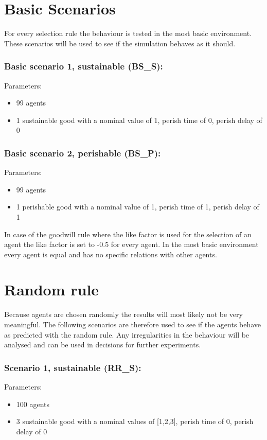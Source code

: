 \documentclass[twoside,openright]{uva-bachelor-thesis}
\begin{document}
\section{Basic Scenarios}
For every selection rule the behaviour is tested in the most basic environment. These scenarios will be used to see if the simulation behaves as it should.
\subsubsection{Basic scenario 1, sustainable (BS\_S):}
Parameters:
\begin{itemize}
\item	99 agents
\item	1 sustainable good with a nominal value of 1, perish time of 0, perish delay of 0
\end{itemize}
\subsubsection{Basic scenario 2, perishable (BS\_P):}
Parameters:
\begin{itemize}
\item	99 agents
\item	1 perishable good with a nominal value of 1, perish time of 1, perish delay of 1
\end{itemize}
In case of the goodwill rule where the like factor is used for the selection of an agent the like factor is set to -0.5 for every agent. In the most basic environment every agent is equal and has no specific relations with other agents.

\section{Random rule}
Because agents are chosen randomly the results will most likely not be very meaningful. The following scenarios are therefore used to see if the agents behave as predicted with the random rule.  Any irregularities in the behaviour will be analysed and can be used in decisions for further experiments.
\subsubsection{Scenario 1, sustainable (RR\_S):}
Parameters:
\begin{itemize}
\item	100 agents
\item	3 sustainable good with a nominal values of [1,2,3], perish time of 0, perish delay of 0
\end{itemize}
\end{document}
